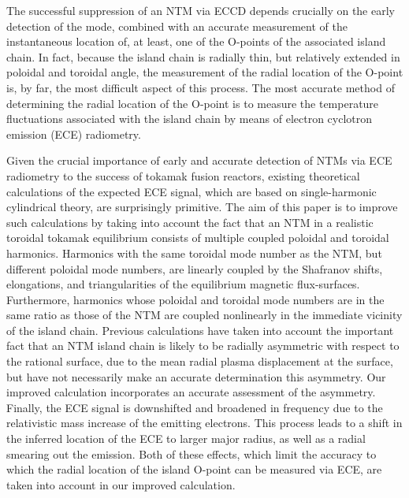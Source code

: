 \documentclass[12pt,prb,aps]{revtex4-1}
\begin{document}
The successful suppression of an NTM via ECCD depends crucially on the early detection of the mode, combined with an accurate measurement  of 
the instantaneous location of, at least, one of the O-points  of the associated island chain.\cite{eccd6} In fact, because the island chain is radially thin, 
but relatively extended in poloidal and toroidal angle, the measurement  of the radial location of the O-point is, by far,  the most difficult aspect of
this process. The most accurate method of determining the radial location of the O-point is to measure the temperature fluctuations associated with the island
chain by means of electron cyclotron emission (ECE) radiometry.\cite{ece1,ece2,ntm2,ece4}

Given the crucial importance of early and accurate detection of NTMs via ECE radiometry to the success of tokamak fusion reactors, existing theoretical calculations of
the expected ECE signal, which are based on single-harmonic cylindrical theory, are surprisingly primitive.\cite{eccd6,ece4,ece4a} The aim of this paper is to
improve such calculations by taking into account the fact that an NTM  in a realistic toroidal tokamak equilibrium consists of multiple coupled poloidal and toroidal harmonics. Harmonics with the same toroidal mode number as the NTM, but different poloidal mode numbers, are linearly coupled by the
Shafranov shifts, elongations, and triangularities of the equilibrium magnetic flux-surfaces.\cite{tear2,tear3,tear5} Furthermore, harmonics whose poloidal and
toroidal mode numbers are in the same ratio as those of the NTM are coupled nonlinearly in the immediate vicinity of the island chain.\cite{ntm1,ntm2}
Previous calculations have taken into account the important fact that an NTM island chain is likely to be radially asymmetric with respect to the rational surface,\cite{ece6} 
due to the mean radial plasma displacement at the  surface, but have not necessarily make an accurate
determination this asymmetry.\cite{eccd6} Our improved calculation incorporates an accurate assessment of the asymmetry. Finally, the ECE signal 
is downshifted and broadened in frequency due to the relativistic mass increase of the emitting electrons.\cite{ece1,ece2,ece5}  This process leads to a shift in the inferred location
of the ECE  to larger major radius, as well as a radial smearing out the emission. Both of these effects, which limit the accuracy to which the
radial location of the island O-point can be measured via ECE,  are taken into account in our improved calculation.
\end{document}
